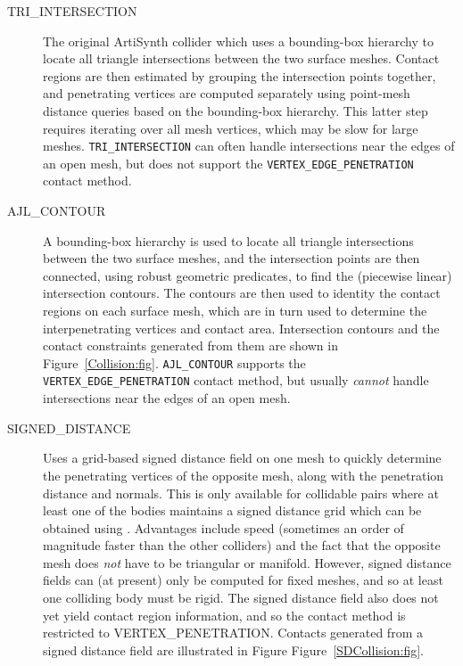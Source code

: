 \begin{description}

\item[TRI\_INTERSECTION]\mbox{}

The original ArtiSynth collider which uses a bounding-box hierarchy to
locate all triangle intersections between the two surface
meshes. Contact regions are then estimated by grouping the
intersection points together, and penetrating vertices are computed
separately using point-mesh distance queries based on the bounding-box
hierarchy. This latter step requires iterating over all mesh vertices,
which may be slow for large meshes. {\tt TRI\_INTERSECTION} can often
handle intersections near the edges of an open mesh, but does not
support the {\tt VERTEX\_EDGE\_PENETRATION} contact method.

\item[AJL\_CONTOUR]\mbox{}

A bounding-box hierarchy is used to locate all triangle intersections
between the two surface meshes, and the intersection points are then
connected, using robust geometric predicates, to find the (piecewise
linear) intersection contours.  The contours are then used to identity
the contact regions on each surface mesh, which are in turn used to
determine the interpenetrating vertices and contact area. Intersection
contours and the contact constraints generated from them are shown in
Figure~\ref{Collision:fig}.  {\tt AJL\_CONTOUR} supports the {\tt
VERTEX\_EDGE\_PENETRATION} contact method, but usually {\it cannot}
handle intersections near the edges of an open mesh.

\item[SIGNED\_DISTANCE]\mbox{}

Uses a grid-based signed distance field on one mesh to quickly
determine the penetrating vertices of the opposite mesh, along with
the penetration distance and normals.  This is only available for
collidable pairs where at least one of the bodies maintains a signed
distance grid which can be obtained using
.
Advantages include speed (sometimes an order of magnitude faster than
the other colliders) and the fact that the opposite mesh does {\it
not} have to be triangular or manifold.  However, signed distance
fields can (at present) only be computed for fixed meshes, and so at
least one colliding body must be rigid.  The signed distance field
also does not yet yield contact region information, and so the
contact method is restricted to
%
{VERTEX\_PENETRATION}.
Contacts generated from a signed distance field are illustrated in
Figure Figure~\ref{SDCollision:fig}.


\end{description}
